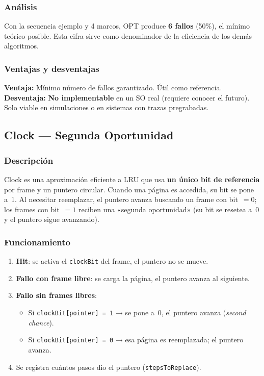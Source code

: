 \documentclass[12pt, a4paper]{article}
\begin{document}
\subsubsection{Análisis}

Con la secuencia ejemplo y 4 marcos, OPT produce \textbf{6 fallos} (50\%), el mínimo teórico posible. Esta cifra sirve como denominador de la eficiencia de los demás algoritmos.

\subsubsection{Ventajas y desventajas}

\begin{infobox}[title={OPT}]
\textbf{Ventaja:} Mínimo número de fallos garantizado. Útil como referencia. \\
\textbf{Desventaja:} \textbf{No implementable} en un SO real (requiere conocer el futuro). Solo viable en simulaciones o en sistemas con trazas pregrabadas.
\end{infobox}

\subsection{Clock — Segunda Oportunidad}

\subsubsection{Descripción}

Clock es una aproximación eficiente a LRU que usa \textbf{un único bit de referencia} por frame y un puntero circular. Cuando una página es accedida, su bit se pone a~1. Al necesitar reemplazar, el puntero avanza buscando un frame con bit~$= 0$; los frames con bit~$= 1$ reciben una «segunda oportunidad» (su bit se resetea a~0 y el puntero sigue avanzando).

\subsubsection{Funcionamiento}

\begin{enumerate}
  \item \textbf{Hit}: se activa el \texttt{clockBit} del frame, el puntero no se mueve.
  \item \textbf{Fallo con frame libre}: se carga la página, el puntero avanza al siguiente.
  \item \textbf{Fallo sin frames libres}:
    \begin{itemize}
      \item Si \texttt{clockBit[pointer] = 1} → se pone a~0, el puntero avanza (\textit{second chance}).
      \item Si \texttt{clockBit[pointer] = 0} → esa página es reemplazada; el puntero avanza.
    \end{itemize}
  \item Se registra cuántos pasos dio el puntero (\texttt{stepsToReplace}).
\end{enumerate}
\end{document}

